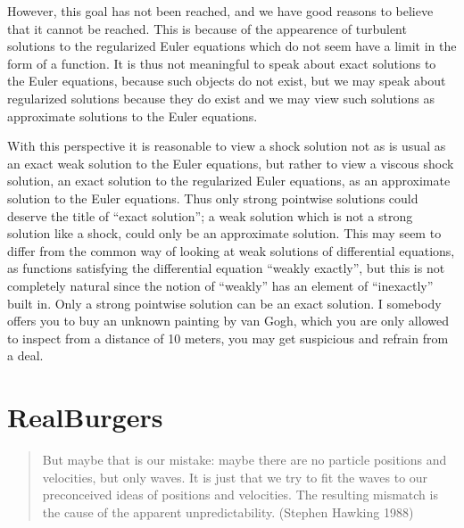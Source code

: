 However, this goal has not been reached, and we have good reasons
to believe that it cannot be reached. This is 
because of the appearence of turbulent solutions to the 
regularized Euler equations which do not seem have a limit in the form
of a function. It is thus not meaningful to speak about 
exact solutions to the Euler equations, because such objects do not
exist, but we may speak about regularized solutions because
they do exist and we may view such solutions as approximate
solutions to the Euler equations.

With this perspective it is reasonable to view a shock solution
not as is usual as an exact weak solution to the Euler equations, 
but rather to view a viscous shock solution, an exact solution to the 
regularized Euler equations, as an approximate solution to the 
Euler equations. 
Thus only strong pointwise solutions could deserve the
title of ``exact solution''; a weak solution 
which is not a strong solution like a shock, could only be an approximate 
solution. This may seem to differ from the common way of looking at 
weak solutions of differential equations, as functions satisfying
the differential equation ``weakly exactly'', but this is not completely
natural since the notion of ``weakly'' has an element of ``inexactly''
built in. Only a strong pointwise solution can be an exact solution.
I somebody offers you to buy an unknown painting by
van Gogh,  which you are only allowed to inspect from a distance
of 10 meters, you may get suspicious and refrain from a deal.

 

\chapter{RealBurgers}

\small
\begin{quote} But maybe that is our mistake: 
maybe there are no particle positions and velocities, but only waves. 
It is just that we try to fit the waves to our preconceived ideas of 
positions and velocities. The resulting mismatch is the cause of the 
apparent unpredictability. (Stephen Hawking 1988)
\end{quote}
\normalsize  

